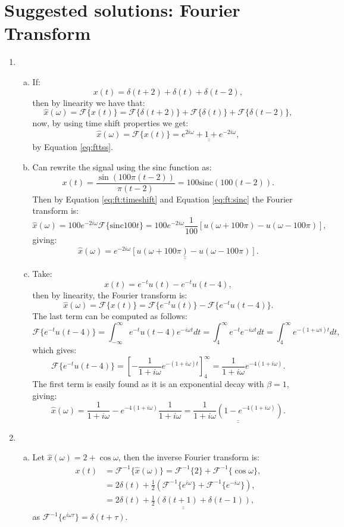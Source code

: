 \newpage
\section{Suggested solutions: Fourier Transform}
\begin{enumerate}

\item
\begin{enumerate}[a)]
\item If:
$$x(t)=\delta(t+2)+\delta(t)+\delta(t-2),$$
then by linearity we have that:
$$\hat{x}(\omega)=\mathcal{F}\{x(t)\}=\mathcal{F}\{\delta(t+2)\}+\mathcal{F}\{\delta(t)\}+\mathcal{F}\{\delta(t-2)\},$$
now, by using time shift properties we get:
$$\hat{x}(\omega)=\mathcal{F}\{x(t)\}=\underline{\underline{e^{2i\omega}+1+e^{-2i\omega}}},$$
by Equation \ref{eq:fttss}.

\item Can rewrite the signal using the sinc function as:
$$x(t)=\frac{\sin(100\pi(t-2))}{\pi(t-2)}=100\text{sinc}(100(t-2)).$$
Then by Equation \ref{eq:ft:timeshift} and Equation \ref{eq:ft:sinc} the Fourier transform is:
$$\hat{x}(\omega)=100e^{-2i\omega}\mathcal{F}\{\text{sinc}100t\}=100e^{-2i\omega} \frac{1}{100}[u(\omega+100\pi)-u(\omega-100\pi)],$$
giving:
$$\hat{x}(\omega)=\underline{\underline{e^{-2i\omega}[u(\omega+100\pi)-u(\omega-100\pi)]}}.$$

\item Take:
$$x(t)=e^{-t}u(t)-e^{-t}u(t-4),$$
then by linearity, the Fourier transform is:
$$\hat{x}(\omega)=\mathcal{F}\{x(t)\}=\mathcal{F}\{e^{-t}u(t)\}-\mathcal{F}\{e^{-t}u(t-4)\}.$$
The last term can be computed as follows:
$$\mathcal{F}\{e^{-t}u(t-4)\} = \int_{-\infty}^{\infty}e^{-t}u(t-4)e^{-i\omega t}dt=\int_{4}^{\infty}e^{-t}e^{-i\omega t}dt=\int_{4}^{\infty}e^{-(1+\omega i)t}dt,$$
which gives:
$$\mathcal{F}\{e^{-t}u(t-4)\} = \left[-\frac{1}{1+i\omega}e^{-(1+i\omega)t}\right]_{4}^{\infty}=\frac{1}{1+i\omega}e^{-4(1+i\omega)}.$$
The first term is easily found as it is an exponential decay with $\beta=1$, giving:
$$\hat{x}(\omega)=\frac{1}{1+i\omega}-e^{-4(1+i\omega)}\frac{1}{1+i\omega}=\underline{\underline{\frac{1}{1+i\omega}\left(1-e^{-4(1+i\omega)}\right)}}.$$
\end{enumerate}

\item
\begin{enumerate}[a)]
\item Let $\hat{x}(\omega)=2+\cos\omega$, then the inverse Fourier transform is:
\begin{align*}
    x(t)&=\mathcal{F}^{-1}\{\hat{x}(\omega)\}=\mathcal{F}^{-1}\{2\}+\mathcal{F}^{-1}\{\cos\omega\}, \\
    &=2\delta(t)+\frac{1}{2}(\mathcal{F}^{-1}\{e^{i\omega}\}+\mathcal{F}^{-1}\{e^{-i\omega}\}), \\ 
    &=\underline{\underline{2\delta(t)+\frac{1}{2}(\delta(t+1)+\delta(t-1))}},
\end{align*}
as $\mathcal{F}^{-1}\{e^{i\omega\tau}\}=\delta(t+\tau)$.


\end{enumerate}
\end{enumerate}
